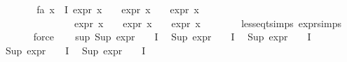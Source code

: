 \begin{isabellebody}
\ \ \isamarkupfalse%
\ {}\ \isamarkupfalse%
\ fa{\isacharunderscore}{\kern0pt}{\isasympsi}{\isacharcolon}{\kern0pt}\ {\isachardoublequoteopen}{\isasymforall}x{\isasymin}{\isasymPhi}\ {\isacharbackquote}{\kern0pt}\ I{\isachardot}{\kern0pt}\ expr{\isacharunderscore}{\kern0pt}{}\ x\ {\isasymle}\ {}\ {\isasymand}\ expr{\isacharunderscore}{\kern0pt}{}\ x\ {\isasymle}\ {\isasyminfinity}\ {\isasymand}\ expr{\isacharunderscore}{\kern0pt}{}\ x\ {\isasymle}\ {}\ {\isasymand}\isanewline
\ \ \ \ \ \ \ \ \ \ \ \ \ \ expr{\isacharunderscore}{\kern0pt}{}\ x\ {\isasymle}\ {}\ {\isasymand}\ expr{\isacharunderscore}{\kern0pt}{}\ x\ {\isasymle}\ {}\ {\isasymand}\ expr{\isacharunderscore}{\kern0pt}{}\ x\ {\isasymle}\ {}{\isachardoublequoteclose}\isanewline
\ \ \ \ \isamarkupfalse%
\ less{\isacharunderscore}{\kern0pt}eq{\isacharunderscore}{\kern0pt}t{\isachardot}{\kern0pt}simps\ expr{\isachardot}{\kern0pt}simps\isanewline
\ \ \ \ \isamarkupfalse%
\ force\isanewline
\ \ \isamarkupfalse%
\ sup{\isacharunderscore}{\kern0pt}{\isasymphi}{\isacharcolon}{\kern0pt}\ {\isachardoublequoteopen}Sup\ {\isacharparenleft}{\kern0pt}{\isacharparenleft}{\kern0pt}expr{\isacharunderscore}{\kern0pt}{}\ {\isasymcirc}\ {\isasymPhi}{\isacharparenright}{\kern0pt}\ {\isacharbackquote}{\kern0pt}\ I{\isacharparenright}{\kern0pt}\ {\isasymle}\ {}{\isachardoublequoteclose}\isanewline
{\isachardoublequoteopen}Sup\ {\isacharparenleft}{\kern0pt}{\isacharparenleft}{\kern0pt}expr{\isacharunderscore}{\kern0pt}{}\ {\isasymcirc}\ {\isasymPhi}{\isacharparenright}{\kern0pt}\ {\isacharbackquote}{\kern0pt}\ I{\isacharparenright}{\kern0pt}\ {\isasymle}\ {\isasyminfinity}{\isachardoublequoteclose}\isanewline
{\isachardoublequoteopen}Sup\ {\isacharparenleft}{\kern0pt}{\isacharparenleft}{\kern0pt}expr{\isacharunderscore}{\kern0pt}{}\ {\isasymcirc}\ {\isasymPhi}{\isacharparenright}{\kern0pt}\ {\isacharbackquote}{\kern0pt}\ I{\isacharparenright}{\kern0pt}\ {\isasymle}\ {}{\isachardoublequoteclose}\isanewline
{\isachardoublequoteopen}Sup\ {\isacharparenleft}{\kern0pt}{\isacharparenleft}{\kern0pt}expr{\isacharunderscore}{\kern0pt}{}\ {\isasymcirc}\ {\isasymPhi}{\isacharparenright}{\kern0pt}\ {\isacharbackquote}{\kern0pt}\ I{\isacharparenright}{\kern0pt}\ {\isasymle}\ {}{\isachardoublequoteclose}\isanewline
{\isachardoublequoteopen}Sup\ {\isacharparenleft}{\kern0pt}{\isacharparenleft}{\kern0pt}expr{\isacharunderscore}{\kern0pt}{}\ {\isasymcirc}\ {\isasymPhi}{\isacharparenright}{\kern0pt}\ {\isacharbackquote}{\kern0pt}\ I{\isacharparenright}{\kern0pt}\ {\isasymle}\ {}{\isachardoublequoteclose}\isanewline

\end{isabellebody}
